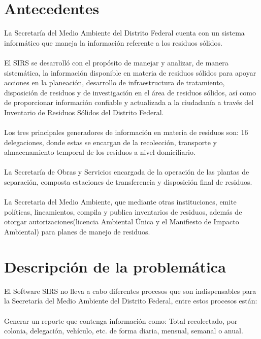 

\section{Antecedentes}
La Secretaría del Medio Ambiente del Distrito Federal cuenta con un sistema informático que maneja la información referente a los residuos sólidos.\\\\
El SIRS se desarrolló con el propósito de manejar y analizar, de manera sistemática, la información disponible en materia de residuos sólidos para apoyar acciones en la planeación, desarrollo de infraestructura de tratamiento, disposición de residuos y de investigación en el área de residuos sólidos, así como de proporcionar información confiable y actualizada a la ciudadanía a través del Inventario de Residuos Sólidos del Distrito Federal.\\\\
Los tres principales generadores de información en materia de residuos son:
16 delegaciones, donde estas se encargan de la recolección, transporte y almacenamiento temporal de los residuos a nivel domiciliario.\\\\
La Secretaría de Obras y Servicios encargada de la operación de las plantas de separación, composta estaciones de transferencia y disposición final de residuos.\\\\
La Secretaria del Medio Ambiente, que mediante otras instituciones, emite políticas, lineamientos, compila y publica inventarios de residuos, además de otorgar autorizaciones(licencia Ambiental Única y el Manifiesto de Impacto Ambiental) para planes de manejo de residuos.




\section{Descripción de la problemática}
El Software SIRS no lleva a cabo diferentes procesos que son indispensables para  la Secretaría del Medio Ambiente del Distrito Federal, entre estos procesos están:\\\\

\textbullet Generar un reporte que contenga información como: Total recolectado, por colonia, delegación, vehículo, etc. de forma diaria, mensual, semanal o anual.\\\\

